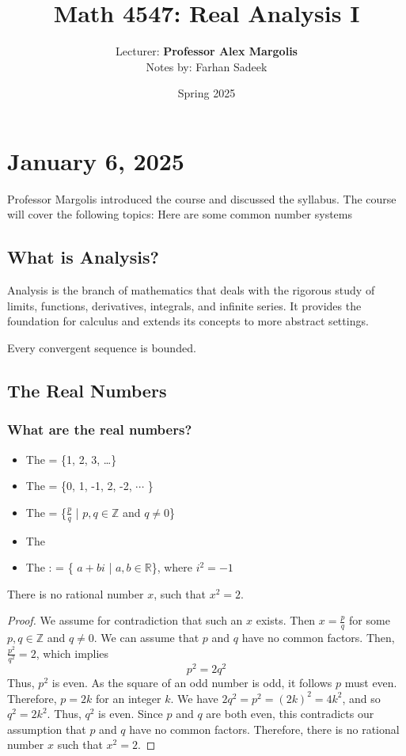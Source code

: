 \documentclass[11pt]{article}
\title{Math 4547: Real Analysis I}
\author{Lecturer: \textbf{Professor Alex Margolis}\\Notes by: Farhan Sadeek}
\date{Spring 2025}
\begin{document}
\maketitle
\section{January 6, 2025}
Professor Margolis introduced the course and discussed the syllabus. The course
will cover the following topics: Here are some common number systems
\subsection{What is Analysis?}
Analysis is the branch of mathematics that deals with the rigorous study of
limits, functions, derivatives, integrals, and infinite series. It provides the
foundation for calculus and extends its concepts to more abstract settings.

\begin{theorem}
	Every convergent sequence is bounded.
\end{theorem}
\subsection{The Real Numbers}
\subsubsection{What are the real numbers?}

\begin{itemize}
	\item The  = \{1, 2, 3, \ldots\}
	\item The  = \{0, 1, -1, 2, -2, $\cdots$ \}
	\item The  = \{$\frac{p}{q}$ | $p,q \in
		      \mathbb{Z}$ and $q \neq 0$\}
	\item The 
	\item The : = \{ $a + bi$ | $a,b \in
		      \mathbb{R}$\}, where $i^2 = -1$
\end{itemize}

\begin{theorem}
	There is no rational number $x$, such that $x^2 = 2$.
\end{theorem}

\begin{proof}
	We assume for contradiction that such an $x$ exists. Then $x = \frac{p}{q}$ for some $p, q \in \mathbb{Z}$ and $q \neq 0$. We can assume that $p$ and $q$ have no common factors. Then, $\frac{p^2}{q^2} = 2$, which implies \[p^2 = 2q^2\] Thus, $p^2$ is even. As the square of an odd number is odd, it follows $p$ must
	even. Therefore, $p = 2k$ for an integer $k$. We have $2q^2 = p^2 = {(2k)}^2 =
		4k^2$, and so $q^2 = 2k^2$. Thus, $q^2$ is even. Since $p$ and $q$ are both
	even, this contradicts our assumption that $p$ and $q$ have no common factors.
	Therefore, there is no rational number $x$ such that $x^2 = 2$.
\end{proof}
\end{document}
